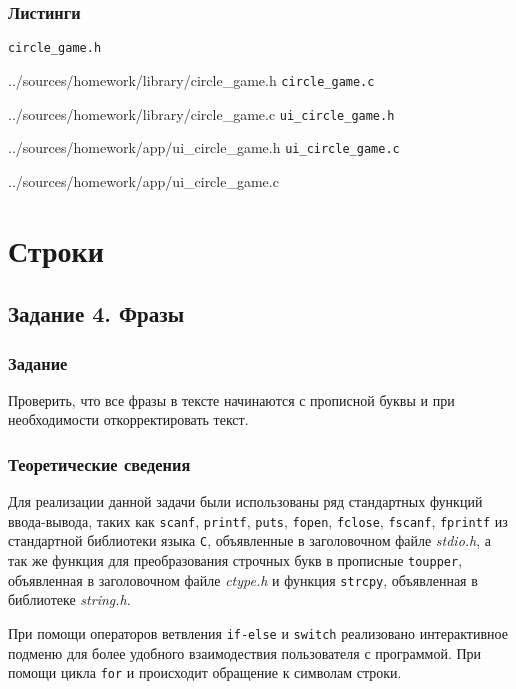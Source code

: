\documentclass[12pt,a4paper]{report}
\begin{document}
\newpage
\subsection{Листинги}
\verb+circle_game.h+

{../sources/homework/library/circle_game.h}
\verb+circle_game.c+

{../sources/homework/library/circle_game.c}
\verb+ui_circle_game.h+

{../sources/homework/app/ui_circle_game.h}
\verb+ui_circle_game.c+

{../sources/homework/app/ui_circle_game.c}




\newpage



\chapter{Строки}
\section{Задание 4. Фразы}
\subsection{Задание}

\hspace{\parindent}Проверить, что все фразы в тексте  начинаются с прописной буквы и при необходимости откорректировать текст.

\subsection{Теоретические сведения}
\hspace{\parindent}Для реализации данной задачи были использованы ряд стандартных функций ввода-вывода, таких как \texttt{scanf}, \texttt{printf}, \texttt{puts}, \texttt{fopen}, \texttt{fclose}, \texttt{fscanf}, \texttt{fprintf} из стандартной библиотеки языка \verb+С+, объявленные в заголовочном файле \textit{stdio.h}, а так же функция для преобразования строчных букв в прописные \verb+toupper+, объявленная в заголовочном файле \textit{ctype.h} и функция \verb+strcpy+, объявленная в библиотеке \textit{string.h}.

При помощи операторов ветвления \texttt{if-else} и \texttt{switch} реализовано интерактивное подменю для более удобного взаимодествия пользователя с программой. При помощи цикла \verb+for+ и происходит обращение к символам строки.
\end{document}
